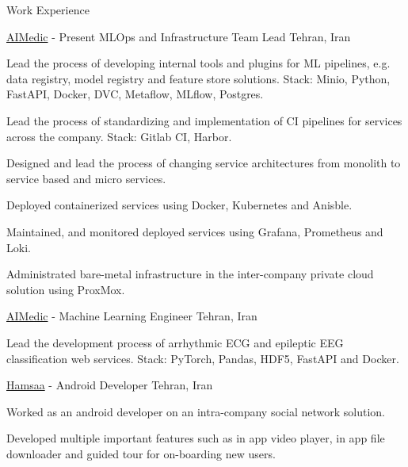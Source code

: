 \documentclass[../resume.tex]{subfiles}
\begin{document}
	\begin{rSection}{Work Experience}
		
		\begin{rSubsection}
			{\href{https://aimedic.co/}{AIMedic}}
			{  - Present }
			{MLOps and Infrastructure Team Lead}
			{Tehran, Iran}
			\item Lead the process of developing internal tools and plugins for ML pipelines, e.g. data registry, model registry and feature store solutions. Stack: Minio, Python, FastAPI, Docker, DVC, Metaflow, MLflow, Postgres.
			\item Lead the process of standardizing and implementation of CI pipelines for services across the company. Stack: Gitlab CI, Harbor.
			\item Designed and lead the process of changing service architectures from monolith to service based and micro services.
			\item Deployed containerized services using Docker, Kubernetes and Anisble.
			\item Maintained, and monitored deployed services using Grafana, Prometheus and Loki.
			\item Administrated bare-metal infrastructure in the inter-company private cloud solution using ProxMox.
			
		\end{rSubsection}
		
		\begin{rSubsection}
			{\href{https://aimedic.co}{AIMedic}}
			{  - \fmtdate{03}{2022} }
			{Machine Learning Engineer}
			{Tehran, Iran}

			\item Lead the development process of arrhythmic ECG and epileptic EEG classification web services. Stack: PyTorch, Pandas, HDF5, FastAPI and Docker.
			
		\end{rSubsection}
		
		\begin{rSubsection}
			{\href{https://hamsaa.ir}{Hamsaa}}
			{  - \fmtdate{11}{2019} }
			{Android Developer}
			{Tehran, Iran}
			
			\item Worked as an android developer on an intra-company social network solution.
			\item Developed multiple important features such as in app video player, in app file downloader and guided tour for on-boarding new users.
			
		\end{rSubsection}
		
	
	\end{rSection}
\end{document}
